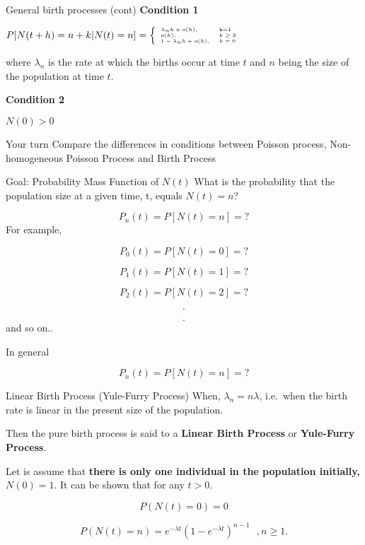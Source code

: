 \documentclass[12pt,ignorenonframetext,]{beamer}
\begin{document}
\begin{frame}{General birth processes (cont)}
\protect\hypertarget{general-birth-processes-cont}{}
\textbf{Condition 1}

\begin{math}
\tiny
 P[N(t+h) = n+k|N(t)=n]=\left\{
    \begin{array}{ll}
      \lambda_n h + o(h), & \mbox{k=1}\\
      o(h), & k \geq 2 \\
      1-\lambda_n h + o(h), & k = 0 \\
    \end{array}
  \right.
\end{math}

where \(\lambda_n\) is the rate at which the births occur at time \(t\)
and \(n\) being the size of the population at time \(t\).

\textbf{Condition 2}

\(N(0) > 0\)
\end{frame}

\begin{frame}{Your turn}
\protect\hypertarget{your-turn}{}
Compare the differences in conditions between Poisson process,
Non-homogeneous Poisson Process and Birth Process
\end{frame}

\begin{frame}{Goal: Probability Mass Function of \(N(t)\)}
\protect\hypertarget{goal-probability-mass-function-of-nt}{}
What is the probability that the population size at a given time, t,
equals \(N(t) = n\)?

\[P_n(t) = P[N(t)=n]= ?\] For example,

\[P_0(t) = P[N(t)=0]= ?\]

\[P_1(t) = P[N(t)=1]= ?\]

\[P_2(t) = P[N(t)=2]= ?\]

\[.\]

\[.\] and so on..

In general

\[P_n(t) = P[N(t)=n]= ?\]
\end{frame}

\begin{frame}{Linear Birth Process (Yule-Furry Process)}
\protect\hypertarget{linear-birth-process-yule-furry-process}{}
When, \(\lambda_n = n \lambda\), i.e.~when the birth rate is linear in
the present size of the population.

Then the pure birth process is said to a \textbf{Linear Birth Process}
or \textbf{Yule-Furry Process}.

Let is assume that \textbf{there is only one individual in the
population initially, \(N(0) = 1\)}. It can be shown that for any
\(t > 0\).

\[P(N(t)=0)=0\]

\[P(N(t)=n)=e^{-\lambda t}(1-e^{-\lambda t})^{n-1}\text{ }, n \geq 1.\]
\end{frame}
\end{document}
